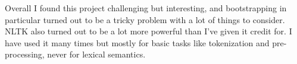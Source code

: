 \documentclass[
10pt, %
a4paper, %
oneside, %
headinclude,footinclude, %
BCOR5mm, %
]{scrartcl}
\begin{document}
Overall I found this project challenging but interesting, and bootstrapping in particular turned out to be a tricky problem with a lot of things to consider. NLTK also turned out to be a lot more powerful than I've given it credit for. I have used it many times but mostly for basic tasks like tokenization and pre-processing, never for lexical semantics.





\end{document}
